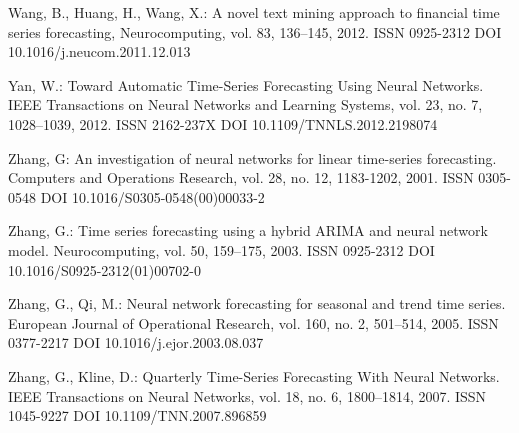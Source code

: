 \begin{thebibliography}{99.}
 Wang, B., Huang, H., Wang, X.: A novel text mining approach to financial time series forecasting, Neurocomputing, vol. 83, 136--145, 2012. ISSN 0925-2312 DOI 10.1016/j.neucom.2011.12.013

 Yan, W.: Toward Automatic Time-Series Forecasting Using Neural Networks. IEEE Transactions on Neural Networks and Learning Systems, vol. 23, no. 7, 1028--1039, 2012. ISSN 2162-237X DOI 10.1109/TNNLS.2012.2198074

 Zhang, G: An investigation of neural networks for linear time-series forecasting. Computers and Operations Research, vol. 28, no. 12, 1183-1202, 2001. ISSN 0305-0548 DOI 10.1016/S0305-0548(00)00033-2

 Zhang, G.: Time series forecasting using a hybrid ARIMA and neural network model. Neurocomputing, vol. 50, 159--175, 2003. ISSN 0925-2312 DOI 10.1016/S0925-2312(01)00702-0

 Zhang, G., Qi, M.: Neural network forecasting for seasonal and trend time series. European Journal of Operational Research, vol. 160, no. 2, 501--514, 2005. ISSN 0377-2217 DOI 10.1016/j.ejor.2003.08.037

 Zhang, G., Kline, D.: Quarterly Time-Series Forecasting With Neural Networks. IEEE Transactions on Neural Networks, vol. 18, no. 6, 1800--1814, 2007. ISSN 1045-9227 DOI 10.1109/TNN.2007.896859

\end{thebibliography}
